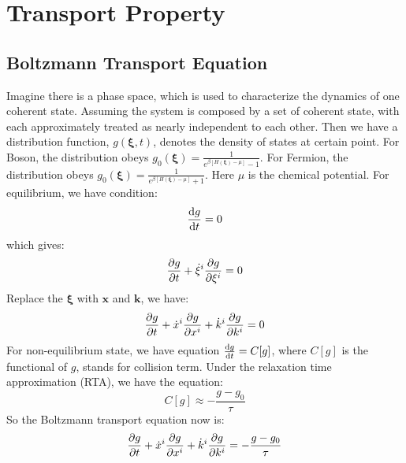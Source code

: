 \documentclass[../main.tex]{subfiles}
\begin{document}
\section{\textbf{Transport Property}}

\subsection{Boltzmann Transport Equation}

Imagine there is a phase space, which is used to characterize the dynamics of one coherent state. Assuming the system is composed by a set of coherent state, with each approximately treated as nearly independent to each other. Then we have a distribution function, $g(\bm{\xi}, t)$, denotes the density of states at certain point. For Boson, the distribution obeys $g_0(\bm{\xi}) = \frac{1}{e^{\beta [H(\bm{\xi})-\mu]} - 1}$. For Fermion, the distribution obeys $g_0(\bm{\xi}) = \frac{1}{e^{\beta [H(\bm{\xi})-\mu]} + 1}$. Here $\mu$ is the chemical potential. For equilibrium, we have condition:
\begin{equation}
    \dv{g}{t} = 0
\end{equation}
which gives:
\begin{equation}
    \pdv{g}{t} + \dot{\xi}^i\pdv{g}{\xi^i} = 0
\end{equation}
Replace the $\bm{\xi}$ with $\bm{x}$ and $\bm{k}$, we have:
\begin{equation}
    \pdv{g}{t} + \dot{x}^i\pdv{g}{x^i} +  \dot{k}^i\pdv{g}{k^i} = 0
\end{equation}
For non-equilibrium state, we have equation $\dv{g}{t} = C[g]$, where $C[g]$ is the functional of $g$, stands for collision term. Under the relaxation time approximation (RTA), we have the equation:
\begin{equation}
    C[g] \approx - \frac{g - g_0}{\tau}
\end{equation}
So the Boltzmann transport equation now is:
\begin{equation}
    \pdv{g}{t} + \dot{x}^i\pdv{g}{x^i} +  \dot{k}^i\pdv{g}{k^i} = - \frac{g - g_0}{\tau}
\end{equation}
\end{document}
